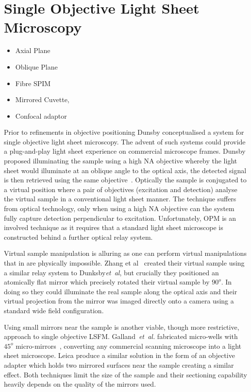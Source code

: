 \section{Single Objective Light Sheet Microscopy}

\begin{itemize}
	\item[\checked] Axial Plane \cite{li_axial_2014}
	\item[\checked] Oblique Plane \cite{dunsby_optically_2008}
	\item[\checked] Fibre SPIM \cite{ploschner_multimode_2015}
	\item[\checked] Mirrored Cuvette,
	\item[\checked] Confocal adaptor
\end{itemize}

Prior to refinements in objective positioning Dunsby conceptualised a system for single objective light sheet microscopy.
The advent of such systems could provide a plug-and-play light sheet experience on commercial microscope frames.
Dunsby proposed illuminating the sample using a high NA objective whereby the light sheet would illuminate at an oblique angle to the optical axis, the detected signal is then retrieved using the same objective~\cite{dunsby_optically_2008}.
Optically the sample is conjugated to a virtual position where a pair of objectives (excitation and detection) analyse the virtual sample in a conventional light sheet manner.
The technique suffers from optical technology, only when using a high NA objective can the system fully capture detection perpendicular to excitation.
Unfortunately, OPM is an involved technique as it requires that a standard light sheet microscope is constructed behind a further optical relay system.

Virtual sample manipulation is alluring as one can perform virtual manipulations that in are physically impossible.
Zhang et al~\cite{li_axial_2014} created their virtual sample using a similar relay system to Dunksby\emph{et~al}, but crucially they positioned an atomically flat mirror which precisely rotated their virtual sample by $90^o$.
In doing so they could illuminate the real sample along the optical axis and their virtual projection from the mirror was imaged directly onto a camera using a standard wide field configuration.

Using small mirrors near the sample is another viable, though more restrictive, approach to single objective LSFM.\@
Galland~\emph{et~al.} fabricated  micro-wells with $45^o$ micro-mirrors~\cite{galland_3d_2015}, converting any commercial scanning microscope into a light sheet microscope.
Leica produce a similar solution in the form of an objective adapter which holds two mirrored surfaces near the sample creating a similar effect.
Both techniques limit the size of the sample and their sectioning capability heavily depends on the quality of the mirrors used.

